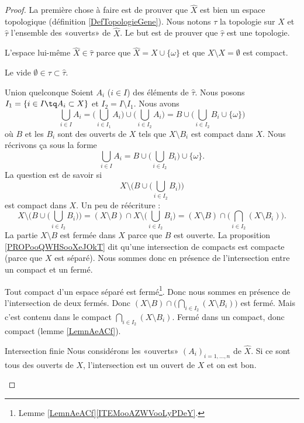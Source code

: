 \begin{proof}
	La première chose à faire est de prouver que \( \hat X\) est bien un espace topologique (définition \ref{DefTopologieGene}). Nous notons \( \tau\) la topologie sur \( X\) et \( \hat\tau\) l'ensemble des «ouverts» de \( \hat X\). Le but est de prouver que \( \hat \tau\) est une topologie.
	\begin{subproof}
		\item[L'espace lui-même]
		\( \hat X\in \hat\tau\) parce que \( \hat X=X\cup \{ \omega \}\) et que \( X\setminus X=\emptyset\) est compact.
		\item[Le vide]
		\( \emptyset\in \tau\subset \hat \tau\).
		\item[Union quelconque]
		Soient \( A_i\) (\( i\in I\)) des éléments de \( \hat\tau\). Nous posons \( I_1=\{ i\in I\tq A_i\subset X \}\) et \( I_2=I\setminus I_1\). Nous avons
		\begin{equation}
			\bigcup_{i\in I}A_i=\big( \bigcup_{i\in I_1}A_i \big)\cup \big( \bigcup_{i\in I_2}A_i \big)=B\cup\big( \bigcup_{i\in I_2}B_i\cup\{ \omega \} \big)
		\end{equation}
		où \( B\) et les \( B_i\) sont des ouverts de \( X\) tels que \( X\setminus B_i\) est compact dans \( X\). Nous récrivons ça sous la forme
		\begin{equation}
			\bigcup_{i\in I}A_i=B\cup\big( \bigcup_{i\in I_2}B_i \big)\cup\{ \omega \}.
		\end{equation}
		La question est de savoir si
		\begin{equation}
			X\setminus\Big( B\cup\big( \bigcup_{i\in I_2}B_i \big) \Big)
		\end{equation}
		est compact dans \( X\). Un peu de réécriture :
		\begin{equation}
			X\setminus\Big( B\cup\big( \bigcup_{i\in I_2}B_i \big) \Big)=(X\setminus B)\cap X\setminus\big( \bigcup_{i\in I_2}B_i \big)=(X\setminus B)\cap\big( \bigcap_{i\in I_2}(X\setminus B_i) \big).
		\end{equation}
		La partie \( X\setminus B\) est fermée dans \( X\) parce que \( B\) est ouverte. La proposition \ref{PROPooQWHSooXeJOkT} dit qu'une intersection de compacts est compacte (parce que \( X\) est séparé). Nous sommes donc en présence de l'intersection entre un compact et un fermé.

		Tout compact d'un espace séparé est fermé\footnote{Lemme \ref{LemnAeACf}\ref{ITEMooAZWVooLyPDeY}.}. Donc nous sommes en présence de l'intersection de deux fermés. Donc
		$(X\setminus B)\cap\big( \bigcap_{i\in I_2}(X\setminus B_i) \big)$ est fermé. Mais c'est contenu dans le compact \( \bigcap_{i\in I_2}(X\setminus B_i)\). Fermé dans un compact, donc compact (lemme \ref{LemnAeACf}).
		\item[Intersection finie]
		Nous considérons les «ouverts» \( (A_i)_{i=1,\ldots, n}\) de \( \hat X\). Si ce sont tous des ouverts de \( X\), l'intersection est un ouvert de \( X\) et on est bon.


\end{subproof}
\end{proof}
